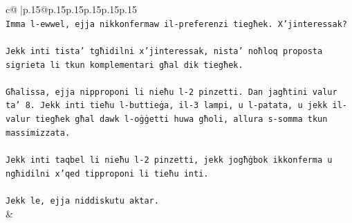 \documentclass{article}
\begin{document}
{\begin{supertabular}{c@{$\;$}|p{.15\linewidth}@{}p{.15\linewidth}p{.15\linewidth}p{.15\linewidth}p{.15\linewidth}p{.15\linewidth}}
{{{\\ 
\texttt{Imma l{-}ewwel, ejja nikkonfermaw il{-}preferenzi tiegħek. X'jinteressak?} \\
\\ 
\texttt{Jekk inti tista' tgħidilni x'jinteressak, nista' noħloq proposta sigrieta li tkun komplementari għal dik tiegħek.} \\
\\ 
\texttt{Għalissa, ejja nipproponi li nieħu l{-}2 pinzetti. Dan jagħtini valur ta' 8. Jekk inti tieħu l{-}buttieġa, il{-}3 lampi, u l{-}patata, u jekk il{-}valur tiegħek għal dawk l{-}oġġetti huwa għoli, allura s{-}somma tkun massimizzata.} \\
\\ 
\texttt{Jekk inti taqbel li nieħu l{-}2 pinzetti, jekk jogħġbok ikkonferma u ngħidilni x'qed tipproponi li tieħu inti.} \\
\\ 
\texttt{Jekk le, ejja niddiskutu aktar.} \\
            }
        }
    }
    & \\ \\


\end{supertabular}}
\end{document}
